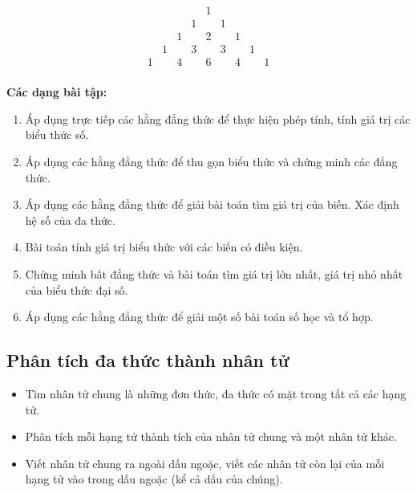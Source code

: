 \documentclass[12pt,a4paper]{article}
\begin{document}
\begin{congthuc}[title={Tam giác Pascal \normalfont\textit{(Nâng cao)}}]
  \[
    \begin{array}{ccccccccc}
        &   &   &   & 1 &   &   &   &   \\
        &   &   & 1 &   & 1 &   &   &   \\
        &   & 1 &   & 2 &   & 1 &   &   \\
        & 1 &   & 3 &   & 3 &   & 1 &   \\
      1 &   & 4 &   & 6 &   & 4 &   & 1 \\
    \end{array}
  \]
\end{congthuc}

\medskip\noindent\textbf{Các dạng bài tập:}
\begin{enumerate}[label=\textbf{Dạng \arabic*:}, leftmargin=*, align=left]
  \item Áp dụng trực tiếp các hằng đẳng thức để thực hiện phép tính, tính giá trị các biểu thức số.
  \item Áp dụng các hằng đẳng thức để thu gọn biểu thức và chứng minh các đẳng thức.
  \item Áp dụng các hằng đẳng thức để giải bài toán tìm giá trị của biến. Xác định hệ số của đa thức.
  \item Bài toán tính giá trị biểu thức với các biến có điều kiện.
  \item Chứng minh bất đẳng thức và bài toán tìm giá trị lớn nhất, giá trị nhỏ nhất của biểu thức đại số.
  \item Áp dụng các hằng đẳng thức để giải một số bài toán số học và tổ hợp.
\end{enumerate}

\subsection{Phân tích đa thức thành nhân tử}

\begin{phuongphap}[title={Phương pháp đặt nhân tử chung}]
  \begin{itemize}
    \item Tìm nhân tử chung là những đơn thức, đa thức có mặt trong tất cả các hạng tử.
    \item Phân tích mỗi hạng tử thành tích của nhân tử chung và một nhân tử khác.
    \item Viết nhân tử chung ra ngoài dấu ngoặc, viết các nhân tử còn lại của mỗi hạng tử vào trong dấu ngoặc (kể cả dấu của chúng).
  \end{itemize}
\end{phuongphap}
\end{document}
